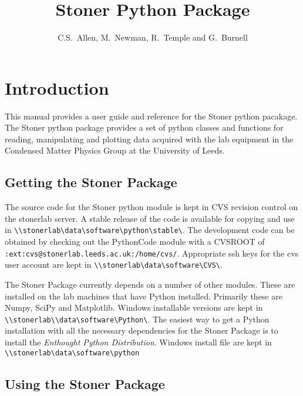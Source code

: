 \documentclass[a4paper,11pt]{scrartcl}
\author{C.S.~Allen, M.~Newman, R.~Temple and G.~Burnell}
\title{Stoner Python Package}
\begin{document}
\maketitle

\tableofcontents
\newpage
\pagestyle{scrheadings} 
\ifoot[\today]{\today}



  \section{Introduction}

This manual provides a user guide and reference for the Stoner python pacakage.
The Stoner python package provides a set of python classes and functions for
reading, manipulating and plotting data acquired with the lab equipment in the
Condensed Matter Physics Group at the University of Leeds.

\subsection{Getting the Stoner Package}

The source code for the Stoner python module is kept in CVS revision control on
the stonerlab server. A stable release of the code is available for copying and
use in \verb#\\stonerlab\data\software\python\stable\#. The development code can
be obtained by checking out the PythonCode module with a CVSROOT of \\
\verb#:ext:cvs@stonerlab.leeds.ac.uk:/home/cvs/#. Appropriate ssh keys for the
cvs user account are kept in \verb#\\stonerlab\data\software\CVS\#.

The Stoner Package currently depends on a number of other modules. These are
installed on the lab machines that have Python installed. Primarily these are
Numpy, SciPy and Matplotlib. Windows installable versions are kept in \\
\verb#\\stonerlab\\data\software\Python\#.  The easiest way to get a Python
installation with all the necessary dependencies for the Stoner Package is to
install the \textit{Enthought Python Distribution}. Windows install file are
kept in \verb#\\stonerlab\data\software\python#


\subsection{Using the Stoner Package}
\end{document}
